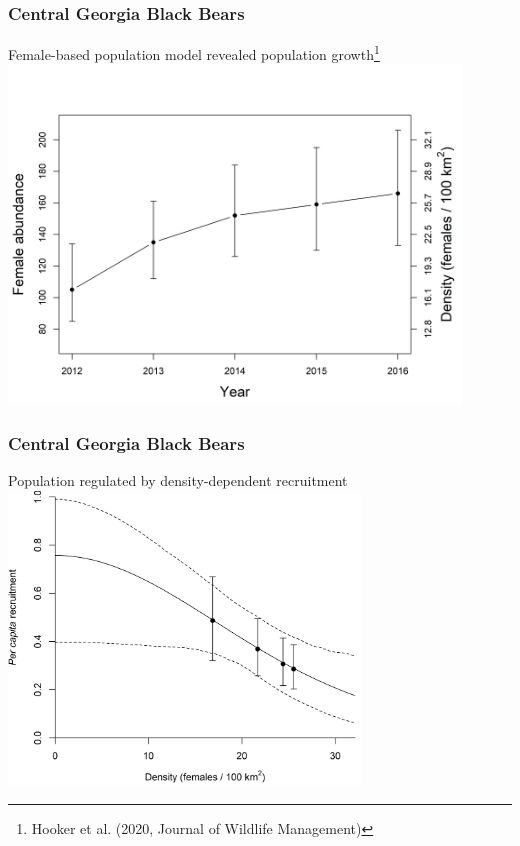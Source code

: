 \documentclass[color=usenames,dvipsnames]{beamer}\usepackage[]{graphicx}\usepackage[]{color}
\begin{document}
\begin{frame}
  \frametitle{Central Georgia Black Bears}
  Female-based population model revealed population
  growth\footnote{Hooker et al. (2020, Journal of Wildlife Management)} \\
  \centering
  \includegraphics[width=0.9\textwidth,trim=0mm 0mm 0mm 10mm,clip]{figs/fig-5_abundance} \\
\end{frame}


\begin{frame}
  \frametitle{Central Georgia Black Bears}
  Population regulated by density-dependent recruitment \\
  \vfill
  \centering
  \includegraphics[width=0.7\textwidth]{figs/fig-3_dd-recruitment} \\
\end{frame}
\end{document}
